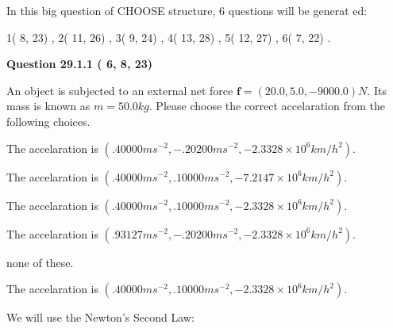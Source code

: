 \documentclass[12pt]{article}
\begin{document}
   
\vspace{0.2in}
   
 In this big question of CHOOSE structure,           6 questions will be generat
 ed: 
  
  
            1(          8,         23)
 ,
            2(         11,         26)
 ,
            3(          9,         24)
 ,
            4(         13,         28)
 ,
            5(         12,         27)
 ,
            6(          7,         22)
 .
  
\vspace{0.2in}
  
{\textbf{\Large{Question
29.1.1 
 (          6,          8,         23)
}}}
  
  
 
An object is subjected to an external net force $\mathbf{f}=(
20.0 ,
5.0,
-9000.0  )N$. Its mass is known as
$m= %
50.0  kg$. Please choose the correct accelaration
from the following choices.
 
 
 
The accelaration is
$(
.40000ms^{-2},
-.20200ms^{-2},
-2.3328 \times 10^{6}km/h^2
).
$
 
 
The accelaration is
$(
.40000ms^{-2},
.10000ms^{-2},
-7.2147 \times 10^{6}km/h^2
).
$
 
 
The accelaration is
$(
.40000ms^{-2},
.10000ms^{-2},
-2.3328 \times 10^{6}km/h^2
).
$
 
 
The accelaration is
$(
.93127ms^{-2},
-.20200ms^{-2},
-2.3328 \times 10^{6}km/h^2
).
$
 
 
none of these.
 
 
\noindent{}
 
 
The accelaration is
$(
.40000ms^{-2},
.10000ms^{-2},
-2.3328 \times 10^{6}km/h^2
).
$
 
 
\noindent{}
 
 
 
 
 
 
\noindent{}
 
 

We will use the Newton's Second Law:
 
\end{document}
